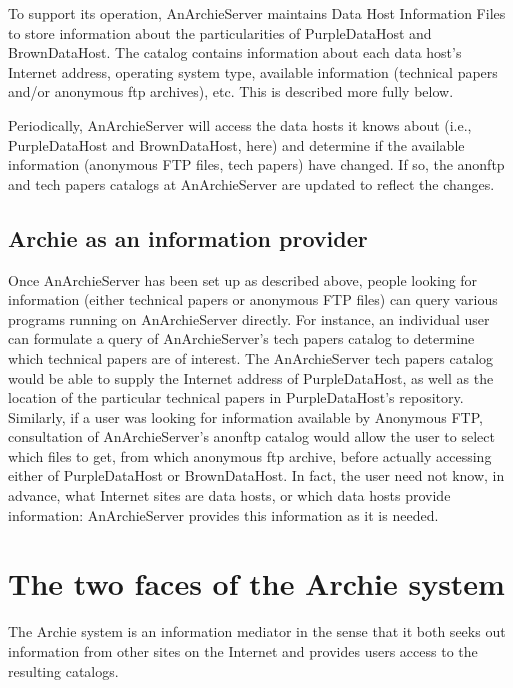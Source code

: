 To support its operation, AnArchieServer maintains Data Host Information Files
to store information about the particularities of PurpleDataHost and
BrownDataHost. The catalog contains information about each data host's
Internet address, operating system type, available information (technical
papers and/or anonymous ftp archives), etc. This is described more fully
below.

Periodically, AnArchieServer will access the data hosts it knows about (i.e.,
PurpleDataHost and BrownDataHost, here) and determine if the available
information (anonymous FTP files, tech papers) have changed. If so, the anonftp
and tech papers catalogs at AnArchieServer are updated to reflect the changes.

%
%
%
\subsection{Archie as an information provider}

Once AnArchieServer has been set up as described above, people looking for
information (either technical papers or anonymous FTP files) can query various
programs running on AnArchieServer directly. For instance, an individual user
can formulate a query of AnArchieServer's tech papers catalog to determine
which technical papers are of interest. The AnArchieServer tech papers catalog
would be able to supply the Internet address of PurpleDataHost, as well as the
location of the particular technical papers in PurpleDataHost's
repository. Similarly, if a user was looking for information available by
Anonymous FTP, consultation of AnArchieServer's anonftp catalog would allow
the user to select which files to get, from which anonymous ftp archive,
before actually accessing either of PurpleDataHost or BrownDataHost. In fact,
the user need not know, in advance, what Internet sites are data hosts, or
which data hosts provide information: AnArchieServer provides this information
as it is needed.





%
%
%

\section{The two faces of the Archie system}

The Archie system is an information mediator in the sense that it both seeks
out information from other sites on the Internet and provides users access to
the resulting catalogs.


